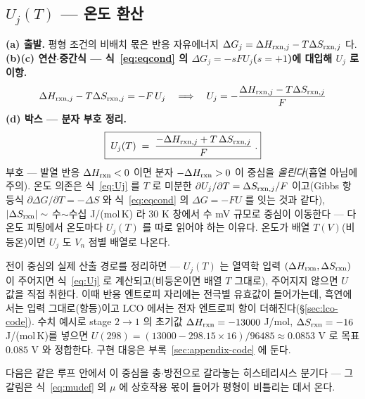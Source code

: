 \subsection{$U_j(T)$ --- 온도 환산}\label{sec:center-Uj}
\textbf{(a) 출발.} 평형 조건의 비배치 몫은 반응 자유에너지 $\Delta G_j=\Delta H_{\mathrm{rxn},j}-T\Delta S_{\mathrm{rxn},j}$ 다.
\textbf{(b)(c) 연산$\cdot$중간식 --- 식~\eqref{eq:eqcond} 의 $\Delta G_j=-sFU_j$($s=+1$)에 대입해 $U_j$ 로 이항.}
\begin{equation}
\Delta H_{\mathrm{rxn},j}-T\Delta S_{\mathrm{rxn},j}=-F\,U_j
\quad\Longrightarrow\quad
U_j=-\frac{\Delta H_{\mathrm{rxn},j}-T\Delta S_{\mathrm{rxn},j}}{F}
\label{eq:Ujmid}
\end{equation}
\textbf{(d) 박스 --- 분자 부호 정리.}
\begin{equation}
\boxed{\;U_j(T)\;=\;\frac{-\Delta H_{\mathrm{rxn},j}+T\,\Delta S_{\mathrm{rxn},j}}{F}\;.}
\label{eq:Uj}
\end{equation}
부호 --- 발열 반응
$\Delta H_{\mathrm{rxn}}<0$ 이면 분자 $-\Delta H_{\mathrm{rxn}}>0$ 이 중심을 \emph{올린다}(흡열 아님에 주의). 온도 의존은 식~\eqref{eq:Uj} 를
$T$ 로 미분한 $\partial U_j/\partial T=\Delta S_{\mathrm{rxn},j}/F$ 이고(Gibbs 항등식 $\partial\Delta G/\partial T=-\Delta S$ 와
식~\eqref{eq:eqcond} 의 $\Delta G=-FU$ 를 잇는 것과 같다), $|\Delta S_{\mathrm{rxn}}|\sim$ 수$\sim$수십 J/(mol\,K) 라 $30$ K
창에서 수 mV 규모로 중심이 이동한다 --- 다온도 피팅에서 온도마다 $U_j(T)$ 를 따로 읽어야 하는 이유다. 온도가 배열
$T(V)$(비등온)이면 $U_j$ 도 $V_n$ 점별 배열로 나온다.

전이 중심의 실제 산출 경로를 정리하면 --- $U_j(T)$ 는 열역학 입력 $(\Delta H_{\mathrm{rxn}},\Delta S_{\mathrm{rxn}})$ 이 주어지면
식~\eqref{eq:Uj} 로 계산되고(비등온이면 배열 $T$ 그대로), 주어지지 않으면 $U$ 값을 직접 취한다. 이때
반응 엔트로피 자리에는 전극별 유효값이 들어가는데, 흑연에서는 입력 그대로(항등)이고 LCO 에서는 전자
엔트로피 항이 더해진다(\S\ref{sec:lco-code}). 수치 예시로 stage $2\to1$ 의 초기값
$\Delta H_{\mathrm{rxn}}=-13000$ J/mol, $\Delta S_{\mathrm{rxn}}=-16$ J/(mol\,K)를 넣으면
$U(298)=(13000-298.15\times16)/96485\approx0.0853$ V 로 목표 $0.085$ V 와 정합한다. 구현 대응은
부록~\ref{sec:appendix-code} 에 둔다.

다음은 같은 루프 안에서 이 중심을 충$\cdot$방전으로 갈라놓는 히스테리시스 분기다 --- 그 갈림은 식~\eqref{eq:mudef} 의
$\mu$ 에 상호작용 몫이 들어가 평형이 비틀리는 데서 온다.


